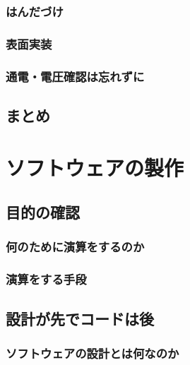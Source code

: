 \documentclass[dvipdfmx]{jsarticle}
\begin{document}
\subsubsection{はんだづけ}

\subsubsection{表面実装}

\subsubsection{通電・電圧確認は忘れずに}


\subsection{まとめ}

\clearpage

\section{ソフトウェアの製作}

\subsection{目的の確認}

\subsubsection{何のために演算をするのか}

\subsubsection{演算をする手段}


\subsection{設計が先でコードは後}

\subsubsection{ソフトウェアの設計とは何なのか}
\end{document}

